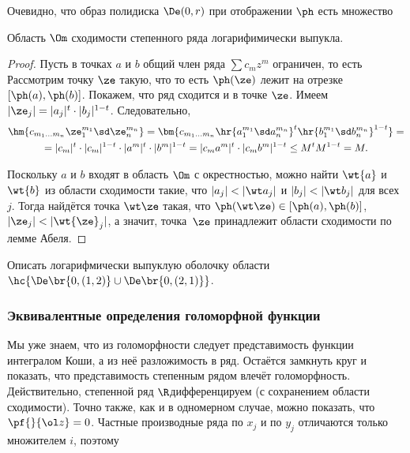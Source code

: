 \documentclass[a4paper]{article}
\begin{document}
Очевидно, что образ полидиска $\De(0,r)$ при отображении $\ph$ есть множество

\begin{theorem}
Область $\Om$ сходимости степенного ряда логарифимически выпукла.
\end{theorem}
\begin{proof}
Пусть в точках $a$ и $b$ общий член ряда $\sum c_m z^m$ ограничен, то есть
Рассмотрим точку $\ze$ такую, что
то есть $\ph(\ze)$ лежит на отрезке $[\ph(a),\ph(b)]$. Покажем, что ряд сходится и в точке $\ze$. Имеем
$|\ze_j|=|a_j|^t \cdot |b_j|^{1-t}$. Следовательно,
\begin{multline}
\hm{c_{m_1\ldots m_n}\ze_1^{m_1} \sd \ze_n^{m_n}}=\bm{c_{m_1\ldots m_n}
\hr{a_1^{m_1} \sd a_n^{m_n}}^t \hr{b_1^{m_1} \sd b_n^{m_n}}^{1-t}} =\\=
|c_m|^t\cdot |c_m|^{1-t}\cdot |a^m|^t\cdot |b^m|^{1-t} = |c_m a^m|^t \cdot |c_m b^m|^{1-t} \le M^t M^{1-t} = M.
\end{multline}

Поскольку $a$ и $b$ входят в область $\Om$ с окрестностью, можно найти $\wt{a}$ и $\wt{b}$ из области
сходимости такие, что $|a_j| < |\wt a_j|$ и $|b_j| < |\wt b_j|$ для всех $j$.
Тогда найдётся точка $\wt \ze$ такая, что $\ph(\wt \ze) \in [\ph(a),\ph(b)]$,
$|\ze_j| < |\wt{\ze}_j|$, а значит, точка~$\ze$ принадлежит области сходимости по лемме Абеля.
\end{proof}

\begin{problem}
Описать логарифмически выпуклую оболочку области
$\hc{\De\br{0,(1,2)}\cup \De\br{0,(2,1)}}$.
\end{problem}

\subsubsection{Эквивалентные определения голоморфной функции}

Мы уже знаем, что из голоморфности следует представимость функции интегралом Коши, а из неё\т
разложимость в ряд. Остаётся замкнуть круг и показать, что представимость степенным рядом
влечёт голоморфность. Действительно, степенной ряд $\R$\д дифференцируем (с сохранением области
сходимости). Точно также, как и в одномерном случае, можно показать, что $\pf{}{\ol z} = 0$.
Частные производные ряда по $x_j$ и по $y_j$ отличаются только множителем $i$, поэтому
\end{document}
